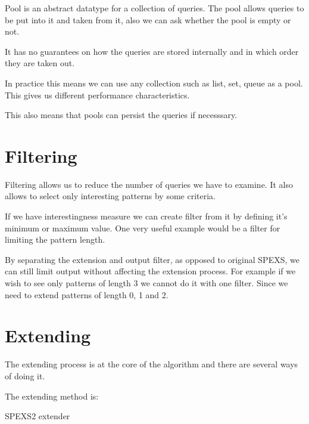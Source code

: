 Pool is an abstract datatype for a collection of queries. The pool
allows queries to be put into it and taken from it, also we can
ask whether the pool is empty or not.

It has no guarantees on how the queries are stored internally and
in which order they are taken out.

In practice this means we can use any collection such as list, set,
queue as a pool. This gives us different performance characteristics.

This also means that pools can persist the queries if necesssary.

\section{Filtering}

Filtering allows us to reduce the number of queries we have to examine.
It also allows to select only interesting patterns by some criteria.

If we have interestingness measure we can create filter from it by
defining it's minimum or maximum value. One very useful example 
would be a filter for limiting the pattern length.

By separating the extension and output filter, as opposed to original SPEXS, 
we can still limit output without affecting the extension process.
For example if we wish to see only patterns of length 3 we cannot do
it with one filter. Since we need to extend patterns of length 0, 1 and 2.

\section{Extending}

The extending process is at the core of the algorithm and there are
several ways of doing it.

The extending method is:

\begin{algorithm}[H]
	\caption{SPEXS2 extender}
\begin{algorithmic}[1]
	
	\EndFor

		\EndIf
	\EndFor

	\EndFor
\end{algorithmic}
\end{algorithm}

